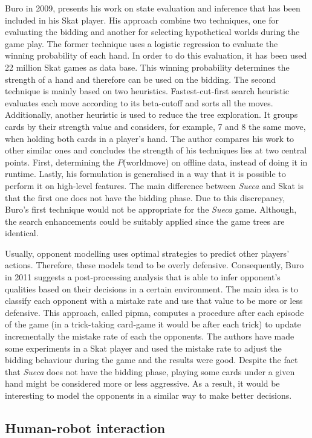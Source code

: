 Buro in 2009, presents his work on state evaluation and inference that has been included in his Skat player. His approach combine two techniques, one for evaluating the bidding and another for selecting hypothetical worlds during the game play. The former technique uses a logistic regression to evaluate the winning probability of each hand. In order to do this evaluation, it has been used 22 million Skat games as data base. This winning probability determines the strength of a hand and therefore can be used on the bidding. The second technique is mainly based on two heuristics. Fastest-cut-first search heuristic evaluates each move according to its beta-cutoff and sorts all the moves. Additionally, another heuristic is used to reduce the tree exploration. It groups cards by their strength value and considers, for example, 7 and 8 the same move, when holding both cards in a player's hand. The author compares his work to other similar ones and concludes the strength of his techniques lies at two central points. First, determining the $P$(world\textbar move) on offline data, instead of doing it in runtime. Lastly, his formulation is generalised in a way that it is possible to perform it on high-level features. The main difference between \emph{Sueca} and Skat is that the first one does not have the bidding phase. Due to this discrepancy, Buro's first technique would not be appropriate for the \emph{Sueca} game. Although, the search enhancements could be suitably applied since the game trees are identical.


Usually, opponent modelling uses optimal strategies to predict other players' actions. Therefore, these models tend to be overly defensive. Consequently, Buro in 2011 suggests a post-processing analysis that is able to infer opponent's qualities based on their decisions in a certain environment. The main idea is to classify each opponent with a mistake rate and use that value to be more or less defensive. This approach, called \gls{pipma}, computes a procedure after each episode of the game (in a trick-taking card-game it would be after each trick) to update incrementally the mistake rate of each the opponents. The authors have made some experiments in a Skat player and used the mistake rate to adjust the bidding behaviour during the game and the results were good. Despite the fact that \emph{Sueca} does not have the bidding phase, playing some cards under a given hand might be considered more or less aggressive. As a result, it would be interesting to model the opponents in a similar way to make better decisions.


\subsection{Human-robot interaction}
